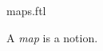 \documentclass{stex}
\begin{document}
\begin{smodule}{maps.ftl}


\begin{fakeforthel}
  \begin{signature}[for=map]
    A \emph{map} is a notion.
  \end{signature}
\end{fakeforthel}

\end{smodule}
\end{document}
